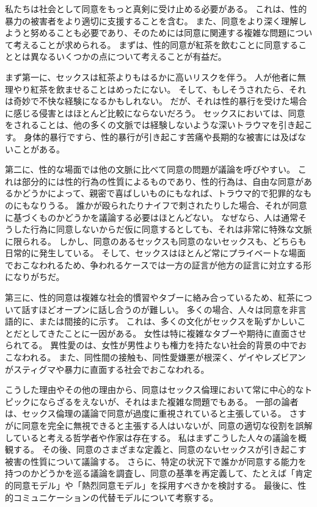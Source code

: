 \documentclass[paper=a4,book,openany]{jlreq} \usepackage{mystyle}
\begin{document}
私たちは社会として同意をもっと真剣に受け止める必要がある。
これは、性的暴力の被害者をより適切に支援することを含む。
また、同意をより深く理解しようと努めることも必要であり、そのためには同意に関連する複雑な問題について考えることが求められる。
まずは、性的同意が紅茶を飲むことに同意することとは異なるいくつかの点について考えることが有益だ。

まず第一に、セックスは紅茶よりもはるかに高いリスクを伴う。
人が他者に無理やり紅茶を飲ませることはめったにない。
そして、もしそうされたら、それは奇妙で不快な経験になるかもしれない。
だが、それは性的暴行を受けた場合に感じる侵害とはほとんど比較にならないだろう。
セックスにおいては、同意をされることは、他の多くの文脈では経験しないような深いトラウマを引き起こす。
身体的暴行ですら、性的暴行が引き起こす苦痛や長期的な被害には及ばないことがある。

第二に、性的な場面では他の文脈に比べて同意の問題が議論を呼びやすい。
これは部分的には性的行為の性質によるものであり、性的行為は、自由な同意があるかどうかによって、親密で喜ばしいものにもなれば、トラウマ的で犯罪的なものにもなりうる。
誰かが殴られたりナイフで刺されたりした場合、それが同意に基づくものかどうかを議論する必要はほとんどない。
なぜなら、人は通常そうした行為に同意しないからだ{\DDASH}仮に同意するとしても、それは非常に特殊な文脈に限られる。
しかし、同意のあるセックスも同意のないセックスも、どちらも日常的に発生している。
そして、セックスはほとんど常にプライベートな場面でおこなわれるため、争われるケースでは一方の証言が他方の証言に対立する形になりがちだ。

第三に、性的同意は複雑な社会的慣習やタブーに絡み合っているため、紅茶について話すほどオープンに話し合うのが難しい。
多くの場合、人々は同意を非言語的に、または間接的に示す。
これは、多くの文化がセックスを恥ずかしいことだとしてきたことに一因がある。
女性は特に複雑なタブーや期待に直面させられてる。
異性愛のは、女性が男性よりも権力を持たない社会的背景の中でおこなわれる。
また、同性間の接触も、同性愛嫌悪が根深く、ゲイやレズビアンがスティグマや暴力に直面する社会でおこなわれる。

こうした理由やその他の理由から、同意はセックス倫理において常に中心的なトピックにならざるをえないが、それはまた複雑な問題でもある。
一部の論者は、セックス倫理の議論で同意が過度に重視されていると主張している。
さすがに同意を完全に無視できると主張する人はいないが、同意の適切な役割を誤解していると考える哲学者や作家は存在する。
私はまずこうした人々の議論を概観する。
その後、同意のさまざまな定義と、同意のないセックスが引き起こす被害の性質について議論する。
さらに、特定の状況下で誰かが同意する能力を持つのかどうかを巡る議論を調査し、同意の基準を再定義して、たとえば「肯定的同意モデル」や「熱烈同意モデル」を採用すべきかを検討する。
最後に、性的コミュニケーションの代替モデルについて考察する。
\end{document}
